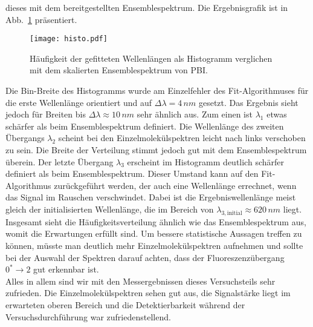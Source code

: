 dieses mit dem bereitgestellten Ensemblespektrum. Die Ergebnisgrafik ist in Abb.~\ref{fig:histo}
präsentiert.
\begin{figure}[h!]
    \centering
    \texttt{[image: histo.pdf]}
    \caption{\label{fig:histo}Häufigkeit der gefitteten Wellenlängen als Histogramm verglichen mit dem skalierten 
    Ensemblespektrum von PBI.}
\end{figure}\FloatBarrier
Die Bin-Breite des Histogramms wurde am Einzelfehler des Fit-Algorithmuses für die erste Wellenlänge orientiert und auf 
$\Delta{\lambda} = 4\,\si{nm}$ gesetzt. Das Ergebnis sieht jedoch für Breiten bis $\Delta{\lambda} \approx 10\,\si{nm}$
sehr ähnlich aus. 
Zum einen ist $\lambda_{1}$ etwas schärfer als beim Ensemblespektrum definiert. Die Wellenlänge des zweiten Übergangs 
$\lambda_{2}$ scheint bei den Einzelmolekülspektren leicht nach links verschoben zu sein. Die Breite der Verteilung stimmt 
jedoch gut mit dem Ensemblespektrum überein. 
Der letzte Übergang $\lambda_{3}$ erscheint im Histogramm deutlich schärfer definiert als beim Ensemblespektrum. 
Dieser Umstand kann auf den Fit-Algorithmus zurückgeführt werden, der auch eine Wellenlänge errechnet, wenn das Signal im 
Rauschen verschwindet. Dabei ist die Ergebniswellenlänge meist gleich der initialisierten Wellenlänge, die im Bereich 
von $\lambda_{3, \text{initial}} \approx 620\,\si{nm}$ liegt. Insgesamt sieht die Häufigkeitsverteilung ähnlich wie das 
Ensemblespektrum aus, womit die Erwartungen erfüllt sind. Um bessere statistische Aussagen treffen zu können, müsste man 
deutlich mehr Einzelmolekülspektren aufnehmen und sollte bei der Auswahl der Spektren darauf achten, dass der 
Fluoreszenzübergang $0^{*}\rightarrow2$ gut erkennbar ist. \\
Alles in allem sind wir mit den Messergebnissen dieses Versuchsteils sehr zufrieden. Die Einzelmolekülspektren sehen 
gut aus, die Signalstärke liegt im erwarteten oberen Bereich und die Detektierbarkeit während der Versuchsdurchführung 
war zufriedenstellend. \\ 







